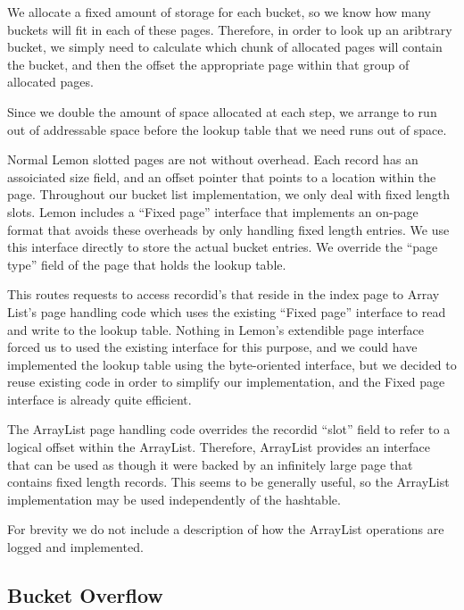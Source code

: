 \documentclass[letterpaper,twocolumn,english]{article}
\newcommand{\yad}{Lemon\xspace}
\begin{document}
We allocate a fixed amount of storage for each bucket, so we know how
many buckets will fit in each of these pages.  Therefore, in order to
look up an aribtrary bucket, we simply need to calculate which chunk
of allocated pages will contain the bucket, and then the offset the
appropriate page within that group of allocated pages.  

Since we double the amount of space allocated at each step, we arrange
to run out of addressable space before the lookup table that we need
runs out of space. 

Normal \yad slotted pages are not without overhead.  Each record has
an assoiciated size field, and an offset pointer that points to a
location within the page.  Throughout our bucket list implementation,
we only deal with fixed length slots.  \yad includes a ``Fixed page''
interface that implements an on-page format that avoids these
overheads by only handling fixed length entries.  We use this
interface directly to store the actual bucket entries.  We override
the ``page type'' field of the page that holds the lookup table.  

This routes requests to access recordid's that reside in the index
page to Array List's page handling code which uses the existing
``Fixed page'' interface to read and write to the lookup table.
Nothing in \yad's extendible page interface forced us to used the
existing interface for this purpose, and we could have implemented the
lookup table using the byte-oriented interface, but we decided to
reuse existing code in order to simplify our implementation, and the
Fixed page interface is already quite efficient.  

The ArrayList page handling code overrides the recordid ``slot'' field
to refer to a logical offset within the ArrayList.  Therefore,
ArrayList provides an interface that can be used as though it were
backed by an infinitely large page that contains fixed length records.
This seems to be generally useful, so the ArrayList implementation may
be used independently of the hashtable.

For brevity we do not include a description of how the ArrayList
operations are logged and implemented.

\subsection{Bucket Overflow}
\end{document}
